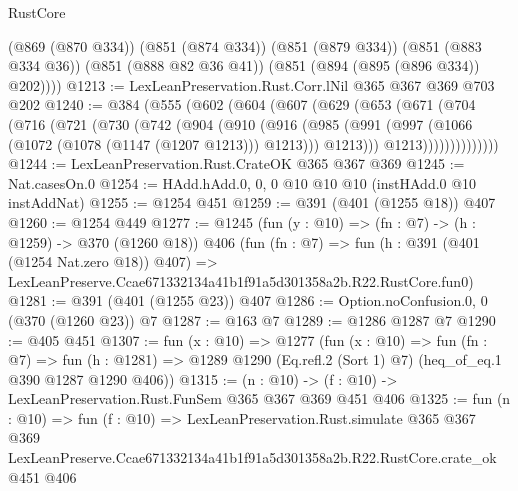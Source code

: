 \begin{lexlean}{RustCore}
\begin{coremodule}
        (@869 (@870 @334))
        (@851 (@874 @334))
        (@851 (@879 @334))
        (@851 (@883 @334 @36))
        (@851 (@888 @82 @36 @41))
        (@851 (@894 (@895 (@896 @334)) @202))))
@1213 := LexLeanPreservation.Rust.Corr.lNil @365 @367 @369 @703 @202
@1240 := @384
    (@555
      (@602
        (@604
          (@607
            (@629
              (@653
                (@671
                  (@704
                    (@716
                      (@721
                        (@730
                          (@742
                            (@904
                              (@910
                                (@916
                                  (@985
                                    (@991
                                      (@997 (@1066 (@1072 (@1078 (@1147 (@1207 @1213))) @1213)))
                                      @1213)))
                                @1213))))))))))))))
@1244 := LexLeanPreservation.Rust.CrateOK @365 @367 @369
@1245 := Nat.casesOn.{0}
@1254 := HAdd.hAdd.{0, 0, 0} @10 @10 @10 (instHAdd.{0} @10 instAddNat)
@1255 := @1254 @451
@1259 := @391 (@401 (@1255 @18)) @407
@1260 := @1254 @449
@1277 := @1245
    (fun (y : @10) => (fn : @7) -> (h : @1259) -> @370 (@1260 @18))
    @406
    (fun (fn : @7) =>
    fun (h : @391 (@401 (@1254 Nat.zero @18)) @407) =>
    LexLeanPreserve.Ccae671332134a41b1f91a5d301358a2b.R22.RustCore.fun0)
@1281 := @391 (@401 (@1255 @23)) @407
@1286 := Option.noConfusion.{0, 0} (@370 (@1260 @23)) @7
@1287 := @163 @7
@1289 := @1286 @1287 @7
@1290 := @405 @451
@1307 := fun (x : @10) =>
  @1277
    (fun (x : @10) =>
    fun (fn : @7) =>
    fun (h : @1281) => @1289 @1290 (Eq.refl.{2} (Sort 1) @7) (heq_of_eq.{1} @390 @1287 @1290 @406))
@1315 := (n : @10) -> (f : @10) -> LexLeanPreservation.Rust.FunSem @365 @367 @369 @451 @406
@1325 := fun (n : @10) =>
  fun (f : @10) =>
  LexLeanPreservation.Rust.simulate
    @365
    @367
    @369
    LexLeanPreserve.Ccae671332134a41b1f91a5d301358a2b.R22.RustCore.crate_ok
    @451
    @406
\end{coremodule}
\end{lexlean}
